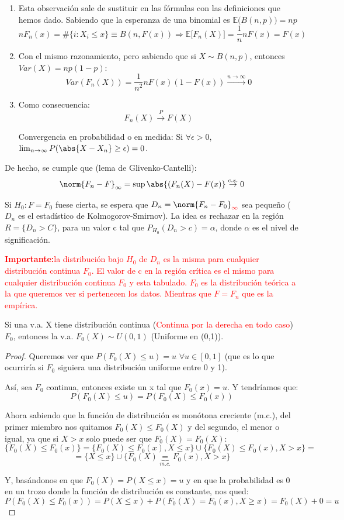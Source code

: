 \documentclass[nochap]{apuntes}
\begin{document}
\begin{obs}
\begin{enumerate}
\item Esta observación sale de sustituir en las fórmulas con las definiciones que hemos dado. Sabiendo que la esperanza de una binomial es $\mathbb{E}\Big(B(n,p)\Big)=np$ $$nF_n(x) = \#\{i:X_i\leq x \} \equiv B(n, F(x))  \Rightarrow \mathbb{E}\Big[F_n(X)\Big] = \frac{1}{n} n F(x) = F(x)$$
\item Con el mismo razonamiento, pero sabiendo que si $X \sim B(n,p)$, entonces $Var(X)=np(1-p)$:
$$ Var(F_n(X))=\frac{1}{n^2}nF(x)(1-F(x)) \stackrel{n \rightarrow \infty}{\rightarrow} 0$$
\item Como consecuencia:
$$ F_n(X) \stackrel{P}{\rightarrow} F(X)$$

Convergencia en probabilidad o en medida: Si $\forall \epsilon >0$, $\lim_{n \rightarrow \infty}P(\abs{X-X_n}\geq \epsilon)=0$.
\end{enumerate}
\end{obs}
De hecho, se cumple que (lema de Glivenko-Cantelli):
$$\norm{F_n-F}_{\infty} = \sup\abs{(F_n(X)-F(x)} \stackrel{c.s.}{\rightarrow} 0$$

Si $H_0: F=F_0$ fuese cierta, se espera que $D_n = \norm{F_n-F_0}_{\textcolor{red}{\infty}}$ sea pequeño ($D_n$ es el estadístico de Kolmogorov-Smirnov). La idea es rechazar en la región $R=\{D_n > C\}$, para un valor c tal que $P_{H_0}(D_n > c)=\alpha$, donde $\alpha$ es el nivel de significación.

\textcolor{red}{\textbf{Importante:}la distribución bajo $H_0$ de $D_n$ es la misma para cualquier distribución continua $F_0$. El valor de c en la región crítica es el mismo para cualquier distribución continua $F_0$ y esta tabulado. $F_0$ es la distribución teórica a la que queremos ver si pertenecen los datos. Mientras que $F=F_n$ que es la empírica.}

\begin{prop}
Si una v.a. X tiene distribución continua (\textcolor{red}{Continua por la derecha en todo caso}) $F_0$, entonces la v.a. $F_0(X) \sim U(0,1)$ (Uniforme en (0,1)).
\end{prop}
\begin{proof}
Queremos ver que $P(F_0(X)\leq u)=u$ $\forall u \in [0,1]$ (que es lo que ocurriría si $F_0$ siguiera una distribución uniforme entre 0 y 1).

Así, sea $F_0$ continua, entonces existe un x tal que $F_0(x)=u$. Y tendríamos que:
$$ P(F_0(X)\leq u) = P(F_0(X)\leq F_0(x)) $$

Ahora sabiendo que la función de distribución es monótona creciente (m.c.), del primer miembro nos quitamos $F_0(X)\leq F_0(X)$ y del segundo, el menor o igual, ya que si $X>x$ solo puede ser que $F_0(X)= F_0(X)$:
$$\{ F_0(X)\leq F_0(x) \} = \{ F_0(X)\leq F_0(x), X \leq x\} \cup \{ F_0(X)\leq F_0(x), X > x\} = $$
$$ =  \{ X \leq x\} \cup \{ F_0(X) \underbrace{=}_{m.c.} F_0(x), X > x\}$$

Y, basándonos en que $F_0(X)=P(X \leq x)=u$ y en que la probabilidad es 0 en un trozo donde la función de distribución es constante, nos qued: 
$$P(F_0(X)\leq F_0(x)) = P(X \leq x) + P(F_0(X) = F_0(x), X \geq x) = F_0(X) + 0 = u$$
\end{proof}
\end{document}
